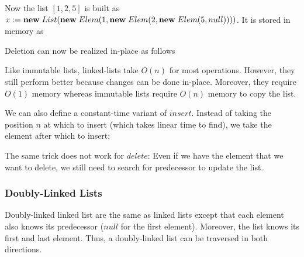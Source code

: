 Now the list $[1,2,5]$ is built as $x:=\textbf{new}\; List(\textbf{new}\; Elem(1, \textbf{new}\; Elem(2, \textbf{new}\; Elem(5, null))))$.
It is stored in memory as
\begin{amemory}
\alocations
{}
\hline
{}
\hline
{}
\hline
{}
\end{amemory}

Deletion can now be realized in-place as follows
\begin{acode}
\end{acode}

Like immutable lists, linked-lists take $O(n)$ for most operations.
However, they still perform better because changes can be done in-place.
Moreover, they require $O(1)$ memory whereas immutable lists require $O(n)$ memory to copy the list.

We can also define a constant-time variant of $insert$.
Instead of taking the position $n$ at which to insert (which takes linear time to find), we take the element after which to insert:
\begin{acode}
\end{acode}

The same trick does not work for $delete$: Even if we have the element that we want to delete, we still need to search for predecessor to update the list.

\subsubsection{Doubly-Linked Lists}

Doubly-linked linked list are the same as linked lists except that each element also knows its predecessor ($null$ for the first element).
Moreover, the list knows its first and last element.
Thus, a doubly-linked list can be traversed in both directions.

\begin{acode}
\\
\end{acode}

